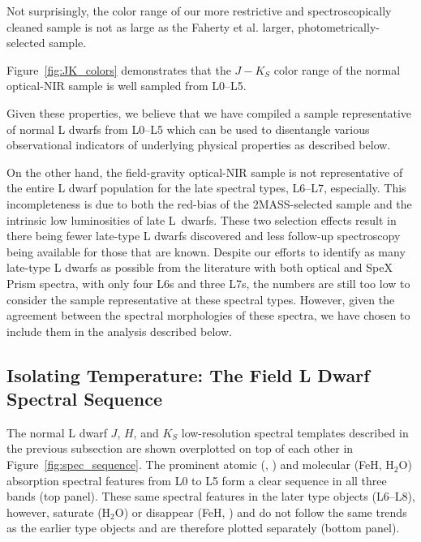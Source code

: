 \documentclass[12pt,preprint]{aastex}
\begin{document}
Not surprisingly, the color range of our more restrictive and spectroscopically cleaned sample is not as large as the Faherty et al. larger, photometrically-selected sample. 


Figure~\ref{fig:JK_colors} demonstrates that the $J-K_S$ color range of the normal optical-NIR sample is well sampled from L0--L5. 

Given these properties, we believe that we have compiled a sample representative of normal L dwarfs from L0--L5 which can be used to disentangle various observational indicators of underlying physical properties as described below.

On the other hand, the field-gravity optical-NIR sample is not representative of the entire L dwarf population for the late spectral types, L6--L7, especially. 
This incompleteness is due to both the red-bias of the 2MASS-selected sample and the intrinsic low luminosities of late L~dwarfs.
These two selection effects result in there being fewer late-type L dwarfs discovered and less follow-up spectroscopy being available for those that are known.
Despite our efforts to identify as many late-type L dwarfs as possible from the literature with both optical and SpeX Prism spectra, with only four L6s and three L7s, the numbers are still too low to consider the sample representative at these spectral types.
However, given the agreement between the spectral morphologies of these spectra, we have chosen to include them in the analysis described below.


\subsection{Isolating Temperature: The Field L Dwarf Spectral Sequence}
\label{sec:temp}
The normal L dwarf $J$, $H$, and $K_S$ low-resolution spectral templates described in the previous subsection are shown overplotted on top of each other in Figure~\ref{fig:spec_sequence}. 
The prominent atomic (, ) and molecular (FeH, H$_2$O) absorption spectral features from L0 to L5 form a clear sequence in all three bands (top panel).
These same spectral features in the later type objects (L6--L8), however, saturate (H$_2$O) or disappear (FeH, ) and do not follow the same trends as the earlier type objects and are therefore plotted separately (bottom panel).

\end{document}
